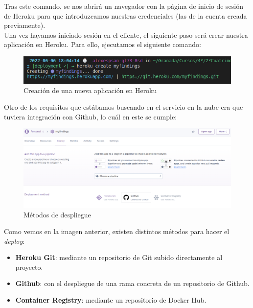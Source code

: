 Tras este comando, se nos abrirá un navegador con la página de inicio de sesión de Heroku
para que introduzcamos nuestras credenciales (las de la cuenta creada previamente).\\

Una vez hayamos iniciado sesión en el cliente, el siguiente paso será crear nuestra
aplicación en Heroku. Para ello, ejecutamos el siguiente comando:

    \begin{figure}[H]
        \centering
        \includegraphics[scale=0.55]{imagenes/heroku-create.png}
        \caption{Creación de una nueva aplicación en Heroku}
        \label{fig:heroku-create}
    \end{figure}

Otro de los requisitos que estábamos buscando en el servicio en la nube era que tuviera
integración con Github, lo cuál en este se cumple: \\

    \begin{figure}[H]
        \centering
        \includegraphics[scale=0.29]{imagenes/deployment-method.png}
        \caption{Métodos de despliegue}
        \label{fig:deployment-method}
    \end{figure}

\newpage Como vemos en la imagen anterior, existen distintos métodos para hacer el
\textit{deploy}:

    \begin{itemize}
        \item \textbf{Heroku Git}: mediante un repositorio de Git subido directamente
        al proyecto.
        \item \textbf{Github}: con el despliegue de una rama concreta de un repositorio
        de Github.
        \item \textbf{Container Registry}: mediante un repositorio de Docker Hub.
    \end{itemize}

